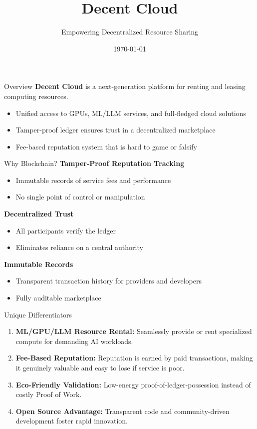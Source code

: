 \documentclass{beamer}
\title{Decent Cloud}
\subtitle{Empowering Decentralized Resource Sharing}
\date{\today}
\begin{document}
{
\begin{frame}[plain]
  \titlepage
\end{frame}
}

\begin{frame}{Overview}
\textbf{Decent Cloud} is a next-generation platform for renting and leasing computing resources.
\begin{itemize}
  \item Unified access to GPUs, ML/LLM services, and full-fledged cloud solutions
  \item Tamper-proof ledger ensures trust in a decentralized marketplace
  \item Fee-based reputation system that is hard to game or falsify
\end{itemize}
\end{frame}

\begin{frame}{Why Blockchain?}
\textbf{Tamper-Proof Reputation Tracking}
\begin{itemize}
  \item Immutable records of service fees and performance
  \item No single point of control or manipulation
\end{itemize}

\textbf{Decentralized Trust}
\begin{itemize}
  \item All participants verify the ledger
  \item Eliminates reliance on a central authority
\end{itemize}

\textbf{Immutable Records}
\begin{itemize}
  \item Transparent transaction history for providers and developers
  \item Fully auditable marketplace
\end{itemize}
\end{frame}

\begin{frame}{Unique Differentiators}
\begin{enumerate}
  \item \textbf{ML/GPU/LLM Resource Rental:} Seamlessly provide or rent specialized compute for demanding AI workloads.
  \item \textbf{Fee-Based Reputation:} Reputation is earned by paid transactions, making it genuinely valuable and easy to lose if service is poor.
  \item \textbf{Eco-Friendly Validation:} Low-energy proof-of-ledger-possession instead of costly Proof of Work.
  \item \textbf{Open Source Advantage:} Transparent code and community-driven development foster rapid innovation.
\end{enumerate}
\end{frame}
\end{document}
